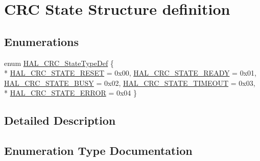 \hypertarget{group___c_r_c___exported___types___group1}{}\section{C\+RC State Structure definition}
\label{group___c_r_c___exported___types___group1}
\subsection*{Enumerations}
\begin{DoxyCompactItemize}
\item 
enum \hyperlink{group___c_r_c___exported___types___group1_ga1021d6f27a072d45f6f3b233eefd8bbe}{H\+A\+L\+\_\+\+C\+R\+C\+\_\+\+State\+Type\+Def} \{ \\*
\hyperlink{group___c_r_c___exported___types___group1_gga1021d6f27a072d45f6f3b233eefd8bbea313bbe8353f8a8b48fbd129261266a97}{H\+A\+L\+\_\+\+C\+R\+C\+\_\+\+S\+T\+A\+T\+E\+\_\+\+R\+E\+S\+ET} = 0x00, 
\hyperlink{group___c_r_c___exported___types___group1_gga1021d6f27a072d45f6f3b233eefd8bbeaa47f50129543b87fac3a83df1a634474}{H\+A\+L\+\_\+\+C\+R\+C\+\_\+\+S\+T\+A\+T\+E\+\_\+\+R\+E\+A\+DY} = 0x01, 
\hyperlink{group___c_r_c___exported___types___group1_gga1021d6f27a072d45f6f3b233eefd8bbea9d03b0c1d233e87e35b9c5c8353a4b70}{H\+A\+L\+\_\+\+C\+R\+C\+\_\+\+S\+T\+A\+T\+E\+\_\+\+B\+U\+SY} = 0x02, 
\hyperlink{group___c_r_c___exported___types___group1_gga1021d6f27a072d45f6f3b233eefd8bbea5d803dcd1d578edb76b57e3d34adc5a8}{H\+A\+L\+\_\+\+C\+R\+C\+\_\+\+S\+T\+A\+T\+E\+\_\+\+T\+I\+M\+E\+O\+UT} = 0x03, 
\\*
\hyperlink{group___c_r_c___exported___types___group1_gga1021d6f27a072d45f6f3b233eefd8bbeadb51c35f7716430bb0c893069466a1b2}{H\+A\+L\+\_\+\+C\+R\+C\+\_\+\+S\+T\+A\+T\+E\+\_\+\+E\+R\+R\+OR} = 0x04
 \}
\end{DoxyCompactItemize}


\subsection{Detailed Description}


\subsection{Enumeration Type Documentation}
